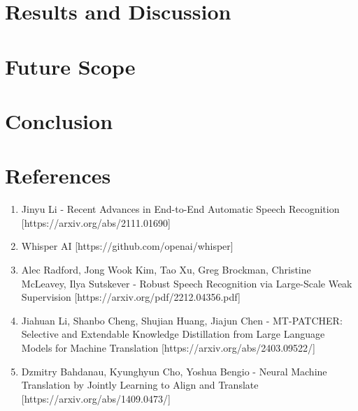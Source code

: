 \documentclass[12px, a4paper]{article}
\begin{document}
\section{Results and Discussion}
\section{Future Scope}
\section{Conclusion}
\section{References}
\begin{enumerate}
    \item Jinyu Li - Recent Advances in End-to-End Automatic Speech Recognition [https://arxiv.org/abs/2111.01690]
    \item Whisper AI [https://github.com/openai/whisper]
    \item Alec Radford, Jong Wook Kim, Tao Xu,  Greg Brockman,  Christine McLeavey, Ilya Sutskever - Robust Speech Recognition via Large-Scale Weak Supervision [https://arxiv.org/pdf/2212.04356.pdf]
    \item Jiahuan Li, Shanbo Cheng, Shujian Huang, Jiajun Chen - MT-PATCHER: Selective and Extendable Knowledge Distillation from Large Language Models for Machine Translation [https://arxiv.org/abs/2403.09522/]
    \item Dzmitry Bahdanau, Kyunghyun Cho, Yoshua Bengio - Neural Machine Translation by Jointly Learning to Align and Translate
    [https://arxiv.org/abs/1409.0473/]
\end{enumerate}
\end{document}
